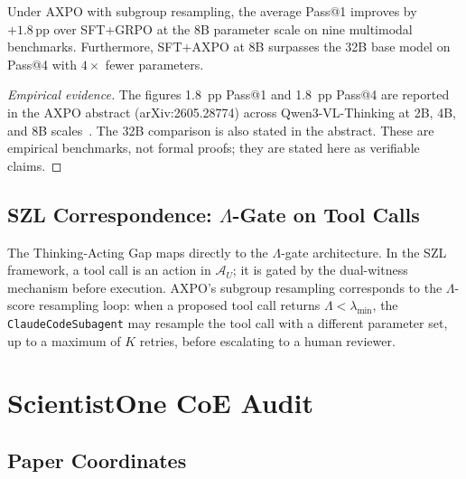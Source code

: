 \begin{theorem}
  \label{thm:axpo-gain}
  Under AXPO with subgroup resampling, the average Pass@1 improves by
  $+1.8\,\mathrm{pp}$ over SFT+GRPO at the 8B parameter scale on nine
  multimodal benchmarks.  Furthermore, SFT+AXPO at 8B surpasses the 32B
  base model on Pass@4 with \(4\times\) fewer parameters.
\end{theorem}

\begin{proof}[Empirical evidence]
  The figures 1.8~pp Pass@1 and 1.8~pp Pass@4 are reported in the AXPO
  abstract (arXiv:2605.28774) across Qwen3-VL-Thinking at 2B, 4B, and 8B
  scales~\cite{axpo_2026}.  The 32B comparison is also stated in the
  abstract.  These are empirical benchmarks, not formal proofs; they are
  stated here as verifiable claims.
\end{proof}

\subsection{SZL Correspondence: \(\Lambda\)-Gate on Tool Calls}
\label{ssec:axpo-szl}

The Thinking-Acting Gap maps directly to the \(\Lambda\)-gate architecture.
In the SZL framework, a tool call is an action in \(\mathcal{A}_U\); it
is gated by the dual-witness mechanism before execution.  AXPO's subgroup
resampling corresponds to the \(\Lambda\)-score resampling loop: when
a proposed tool call returns \(\Lambda < \lambda_{\min}\), the
\texttt{ClaudeCodeSubagent} may resample the tool call with a different
parameter set, up to a maximum of \(K\) retries, before escalating to a
human reviewer.

\section{ScientistOne CoE Audit}
\label{sec:scientistone}

\subsection{Paper Coordinates}
\label{ssec:scientistione-coords}

